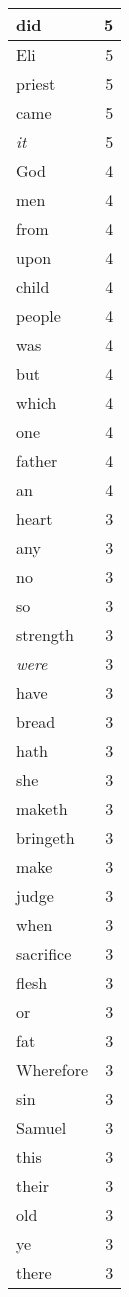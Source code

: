 \begin{center}
\begin{longtable}{l|r}
did & 5 \\ \hline
Eli & 5 \\ \hline
priest & 5 \\ \hline
came & 5 \\ \hline
\emph{it} & 5 \\ \hline
God & 4 \\ \hline
men & 4 \\ \hline
from & 4 \\ \hline
upon & 4 \\ \hline
child & 4 \\ \hline
people & 4 \\ \hline
was & 4 \\ \hline
but & 4 \\ \hline
which & 4 \\ \hline
one & 4 \\ \hline
father & 4 \\ \hline
an & 4 \\ \hline
heart & 3 \\ \hline
any & 3 \\ \hline
no & 3 \\ \hline
so & 3 \\ \hline
strength & 3 \\ \hline
\emph{were} & 3 \\ \hline
have & 3 \\ \hline
bread & 3 \\ \hline
hath & 3 \\ \hline
she & 3 \\ \hline
maketh & 3 \\ \hline
bringeth & 3 \\ \hline
make & 3 \\ \hline
judge & 3 \\ \hline
when & 3 \\ \hline
sacrifice & 3 \\ \hline
flesh & 3 \\ \hline
or & 3 \\ \hline
fat & 3 \\ \hline
Wherefore & 3 \\ \hline
sin & 3 \\ \hline
Samuel & 3 \\ \hline
this & 3 \\ \hline
their & 3 \\ \hline
old & 3 \\ \hline
ye & 3 \\ \hline
there & 3 \\ \hline

\end{longtable}
\end{center}
